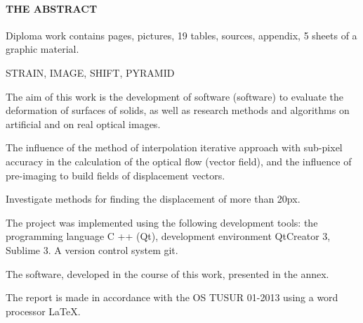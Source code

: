 \newpage
{}
\paragraph{\hfill THE ABSTRACT \hfill}
Diploma work contains  pages,  pictures, 19 tables,  sources,  appendix, 5 sheets of a graphic material.

STRAIN, IMAGE, SHIFT, PYRAMID

The aim of this work is the development of software (software) to evaluate the deformation of surfaces of solids, as well as research methods and algorithms on artificial and on real optical images.

The influence of the method of interpolation iterative approach with sub-pixel accuracy in the calculation of the optical flow (vector field), and the influence of pre-imaging to build fields of displacement vectors.

Investigate methods for finding the displacement of more than 20px.

 

The project was implemented using the following development tools: the programming language C ++ (Qt), development environment QtCreator 3, Sublime 3. A version control system git.

The software, developed in the course of this work, presented in the annex.

The report is made in accordance with the OS TUSUR 01-2013 using a word processor \LaTeX.